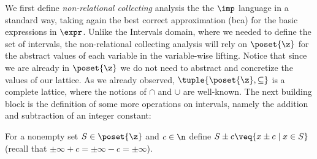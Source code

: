 
We first define \emph{non-relational collecting} analysis the the
\(\imp\) language in a standard way, taking again the best correct
approximation (bca) for the basic expressions in \(\expr\).  Unlike
the Intervals domain, where we needed to define the set of intervals,
the non-relational collecting analysis will rely on \(\poset{\z}\) for
the abstract values of each variable in the variable-wise lifting.
Notice that since we are already in \(\poset{\z}\) we do not need to
abstract and concretize the values of our lattice.  As we already
observed, \(\tuple{\poset{\z}, \subseteq}\) is a complete lattice,
where the notions of \(\cap\) and \(\cup\) are well-known.  The next
building block is the definition of some more operations on intervals,
namely the addition and subtraction of an integer constant:

\begin{definition}
  For a nonempty set \(S \in \poset{\z}\) and \(c \in \n\) define
  \(S \pm c \veq \{x \pm c \mid x \in S\}\) (recall
  that \(\pm \infty + c = \pm\infty - c = \pm\infty\)).
\end{definition}
